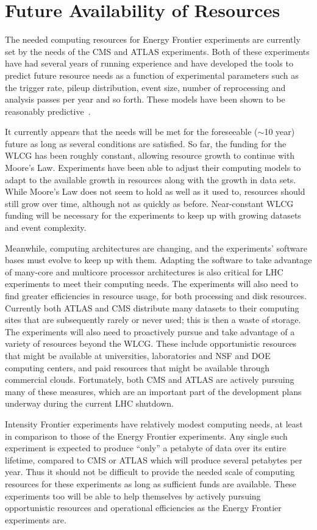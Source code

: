  
\section{Future Availability of Resources}


The needed computing resources for Energy Frontier experiments are currently set by the needs of the CMS and ATLAS experiments.  Both of these experiments have had several years of running experience and have developed the tools to predict future resource needs as a function of experimental parameters such as the trigger rate, pileup distribution, event size, number of reprocessing and analysis passes per year and so forth.  These models have been shown to be reasonably predictive~\cite{bib:CHEPresources}.

It currently appears that the needs will be met for the foreseeable ($\sim$10 year) future as long as several conditions are satisfied.  So far, the funding for the WLCG has been roughly constant, allowing resource growth to continue with Moore's Law.  Experiments have been able to adjust their computing models to adapt to the available growth in resources along with the growth in data sets.  While Moore's Law does not seem to hold as well as it used to, resources should still grow over time, although not as quickly as before.  Near-constant WLCG funding will be necessary for the experiments to keep up with growing datasets and event complexity.  

Meanwhile, computing architectures are changing, and the experiments' software bases must evolve to keep up with them.  Adapting the software to take advantage of many-core and multicore processor architectures is also critical for LHC experiments to meet their computing needs.  The experiments will also need to find greater efficiencies in resource usage, for both processing and disk resources.  Currently both ATLAS and CMS distribute many datasets to their computing sites that are subsequently rarely or never used; this is then a waste of storage.  The experiments will also need to proactively pursue and take advantage of a variety of resources beyond the WLCG.  These include opportunistic resources that might be available at universities, laboratories and NSF and DOE computing centers, and paid resources that might be available through commercial clouds.  Fortunately, both CMS and ATLAS are actively pursuing many of these measures, which are an important part of the development plans underway during the current LHC shutdown.

Intensity Frontier experiments have relatively modest computing needs, at least in comparison to those of the Energy Frontier experiments.  Any single such experiment is expected to produce ``only'' a petabyte of data over its entire lifetime, compared to CMS or ATLAS which will produce several petabytes per year.  Thus it should not be difficult to provide the needed scale of computing resources for these experiments as long as sufficient funds are available.  These experiments too will be able to help themselves by actively pursuing opportunistic resources and operational efficiencies as the Energy Frontier experiments are.

